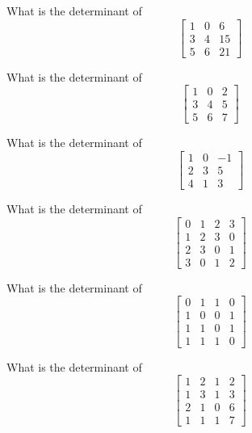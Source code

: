 \bexo
What is the determinant of 
\[
\left[
\begin{array}{ccc}
1 & 0 & 6\\
3 & 4 & 15\\
5 & 6 & 21
\end{array}
\right]
\]
\eexo{}

\bexo
What is the determinant of 
\[
\left[
\begin{array}{ccc}
1& 0 &2\\
3 &4 &5\\
5 &6& 7\end{array}
\right]
\]
\eexo{}

\bexo
What is the determinant of 
\[
\left[
\begin{array}{ccc}
1 &0 &-1\\
2&3&5\\
4&1&3\end{array}
\right]
\]
\eexo{}

\bexo
What is the determinant of 
\[
\left[
\begin{array}{cccc}
0& 1& 2& 3\\
1 &2& 3& 0\\
2 &3& 0& 1\\
3 &0& 1& 2
\end{array}
\right]
\]
\eexo{}

\bexo
What is the determinant of 
\[
\left[
\begin{array}{cccc}
0& 1& 1 &0\\
1& 0& 0 &1\\
1& 1& 0 &1\\
1& 1& 1 &0
\end{array}
\right]
\]
\eexo{}

\bexo
What is the determinant of 
\[
\left[
\begin{array}{cccc}
1& 2& 1& 2\\
1& 3& 1& 3\\
2& 1& 0& 6\\
1& 1& 1& 7
\end{array}
\right]
\]
\eexo{}

